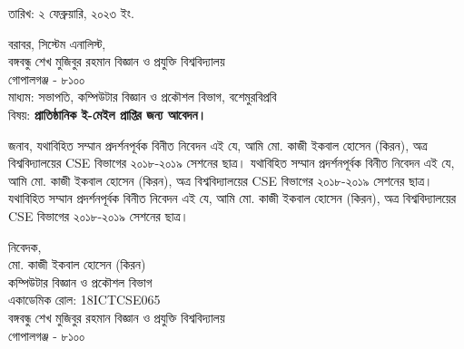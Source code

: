 \documentclass{article}
\begin{document}
\thispagestyle{empty}

\fontsize{14.4}{12}\selectfont %
তারিখ: ২ ফেব্রুয়ারি, ২০২৩  ইং. \linebreak

\vspace{2 pt}
বরাবর, \linebreak
সিস্টেম এনালিস্ট, \\
বঙ্গবন্ধু শেখ মুজিবুর রহমান বিজ্ঞান ও প্রযুক্তি বিশ্ববিদ্যালয় \\
গোপালগঞ্জ - ৮১০০ \\
মাধ্যম: সভাপতি, কম্পিউটার বিজ্ঞান ও প্রকৌশল বিভাগ, বশেমুরবিপ্রবি \\
বিষয়:  \textbf{প্রাতিষ্ঠানিক ই-মেইল প্রাপ্তির জন্য আবেদন।} \linebreak

\vspace{2 pt}

জনাব, \linebreak
{
\justify
যথাবিহিত সম্মান প্রদর্শনপূর্বক বিনীত নিবেদন এই যে, আমি মো. কাজী ইকবাল হোসেন (কিরন), অত্র বিশ্ববিদ্যালয়ের CSE বিভাগের ২০১৮-২০১৯ সেশনের ছাত্র। যথাবিহিত সম্মান প্রদর্শনপূর্বক বিনীত নিবেদন এই যে, আমি মো. কাজী ইকবাল হোসেন (কিরন), অত্র বিশ্ববিদ্যালয়ের CSE বিভাগের ২০১৮-২০১৯ সেশনের ছাত্র। যথাবিহিত সম্মান প্রদর্শনপূর্বক বিনীত নিবেদন এই যে, আমি মো. কাজী ইকবাল হোসেন (কিরন), অত্র বিশ্ববিদ্যালয়ের CSE বিভাগের ২০১৮-২০১৯ সেশনের ছাত্র।
}
\vfill

{
\fontsize{14.4}{13}\selectfont
নিবেদক, \\
মো. কাজী ইকবাল হোসেন (কিরন) \\
কম্পিউটার বিজ্ঞান ও প্রকৌশল বিভাগ \\
একাডেমিক রোল: 18ICTCSE065 \\
বঙ্গবন্ধু শেখ মুজিবুর রহমান বিজ্ঞান ও প্রযুক্তি বিশ্ববিদ্যালয় \\
গোপালগঞ্জ - ৮১০০
}
\end{document}
